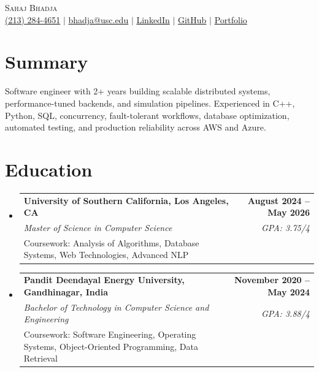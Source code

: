 \documentclass[letterpaper,10pt]{article}
\makeatletter
\newcommand{\resumeEduSubheading}[5]{\vspace{-1pt}\item\begin{tabular*}{1.0\textwidth}[t]{l@{\extracolsep{\fill}}r}\textbf{#1} & \textbf{\small #2} \\\textit{\small #3} & \textit{\small #4} \\\small #5 & \\\end{tabular*}\vspace{-4pt}}
\newcommand{\resumeSubHeadingListStart}{\begin{itemize}[leftmargin=0.0in,label={}]}
\newcommand{\resumeSubHeadingListEnd}{\end{itemize}}
\makeatother
\begin{document}
\begin{center}
  {\Huge \scshape Sahaj Bhadja} \\ \vspace{1pt}
  \small \href{tel:2132844651}{(213) 284-4651} $|$ \href{mailto:bhadja@usc.edu}{bhadja@usc.edu} $|$
  \href{https://www.linkedin.com/in/sahaj-bhadja/}{LinkedIn} $|$ \href{https://github.com/sahaj-bhadja}{GitHub} $|$ \href{https://sahaj-bhadja.github.io/}{Portfolio}
\end{center}
\vspace{-13pt}

\section{Summary}
\small Software engineer with 2+ years building scalable distributed systems, performance-tuned backends, and simulation pipelines. Experienced in C++, Python, SQL, concurrency, fault-tolerant workflows, database optimization, automated testing, and production reliability across AWS and Azure.

\section{Education}
\resumeSubHeadingListStart
  \resumeEduSubheading{University of Southern California, Los Angeles, CA}{August 2024 -- May 2026}{Master of Science in Computer Science}{GPA: 3.75/4}{Coursework: Analysis of Algorithms, Database Systems, Web Technologies, Advanced NLP}
  \vspace{2pt}
  \resumeEduSubheading{Pandit Deendayal Energy University, Gandhinagar, India}{November 2020 -- May 2024}{Bachelor of Technology in Computer Science and Engineering}{GPA: 3.88/4}{Coursework: Software Engineering, Operating Systems, Object-Oriented Programming, Data Retrieval}
\resumeSubHeadingListEnd
\end{document}
